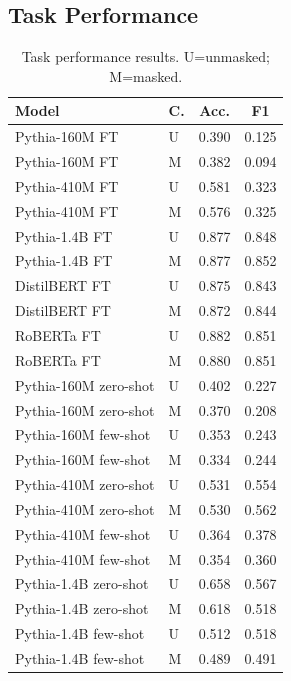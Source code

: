 \documentclass[11pt]{article}
\begin{document}
\subsection{Task Performance}
\begin{table}[h]
\centering\small
\setlength{\tabcolsep}{5pt}
\begin{tabular}{llcc}
\toprule
\textbf{Model} & \textbf{C.} & \textbf{Acc.} & \textbf{F1} \\
\midrule
Pythia-160M FT           & U & 0.390 & 0.125 \\
Pythia-160M FT           & M & 0.382 & 0.094 \\
Pythia-410M FT           & U & 0.581 & 0.323 \\
Pythia-410M FT           & M & 0.576 & 0.325 \\
Pythia-1.4B FT           & U & 0.877 & 0.848 \\
Pythia-1.4B FT           & M & 0.877 & 0.852 \\
\midrule
DistilBERT FT            & U & 0.875 & 0.843 \\
DistilBERT FT            & M & 0.872 & 0.844 \\
RoBERTa FT               & U & 0.882 & 0.851 \\
RoBERTa FT               & M & 0.880 & 0.851 \\
\midrule
Pythia-160M zero-shot    & U & 0.402 & 0.227 \\
Pythia-160M zero-shot    & M & 0.370 & 0.208 \\
Pythia-160M few-shot     & U & 0.353 & 0.243 \\
Pythia-160M few-shot     & M & 0.334 & 0.244 \\
Pythia-410M zero-shot    & U & 0.531 & 0.554 \\
Pythia-410M zero-shot    & M & 0.530 & 0.562 \\
Pythia-410M few-shot     & U & 0.364 & 0.378 \\
Pythia-410M few-shot     & M & 0.354 & 0.360 \\
Pythia-1.4B zero-shot    & U & 0.658 & 0.567 \\
Pythia-1.4B zero-shot    & M & 0.618 & 0.518 \\
Pythia-1.4B few-shot     & U & 0.512 & 0.518 \\
Pythia-1.4B few-shot     & M & 0.489 & 0.491 \\
\bottomrule
\end{tabular}
\caption{Task performance results. U=unmasked; M=masked.}
\label{tab:performance}
\end{table}
\end{document}
